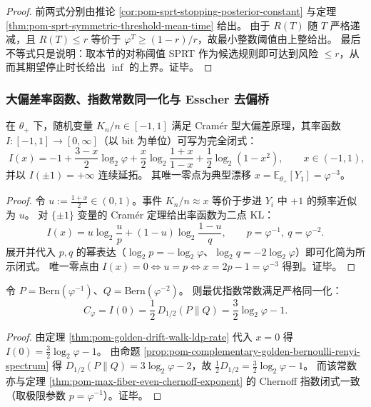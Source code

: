 \begin{proof}
前两式分别由推论 \ref{cor:pom-sprt-stopping-posterior-constant} 与定理 \ref{thm:pom-sprt-symmetric-threshold-mean-time} 给出。
由于 \(R(T)\) 随 \(T\) 严格递减，且 \(R(T)\le r\) 等价于 \(\varphi^T\ge (1-r)/r\)，故最小整数阈值由上整给出。
最后不等式只是说明：取本节的对称阈值 SPRT 作为候选规则即可达到风险 \(\le r\)，从而其期望停止时长给出 \(\inf\) 的上界。证毕。
\end{proof}

\subsubsection{大偏差率函数、指数常数同一化与 Esscher 去偏桥}

\begin{theorem}[黄金漂移随机游走的大偏差率函数闭式]\label{thm:pom-golden-drift-walk-ldp-rate}
在 \(\theta_+\) 下，随机变量 \(K_n/n\in[-1,1]\) 满足 Cram\'er 型大偏差原理，其率函数 \(I:[-1,1]\to[0,\infty]\)（以 bit 为单位）可写为完全闭式：
\[
\boxed{\;
I(x)= -1+\frac{3-x}{2}\log_2\varphi+\frac{x}{2}\log_2\!\frac{1+x}{1-x}+\frac12\log_2(1-x^2),
\qquad x\in(-1,1),\;}
\]
并以 \(I(\pm 1)=+\infty\) 连续延拓。
其唯一零点为典型漂移 \(x=\mathbb{E}_{\theta_+}[Y_1]=\varphi^{-3}\)。
\end{theorem}

\begin{proof}
令 \(u:=\frac{1+x}{2}\in(0,1)\)。事件 \(K_n/n\approx x\) 等价于步进 \(Y_i\) 中 \(+1\) 的频率近似为 \(u\)。
对 \(\{\pm 1\}\) 变量的 Cram\'er 定理给出率函数为二点 KL：
\[
I(x)=u\log_2\frac{u}{p}+(1-u)\log_2\frac{1-u}{q},
\qquad p=\varphi^{-1},\ q=\varphi^{-2}.
\]
展开并代入 \(p,q\) 的幂表达（\(\log_2 p=-\log_2\varphi\)、\(\log_2 q=-2\log_2\varphi\)）即可化简为所示闭式。
唯一零点由 \(I(x)=0\iff u=p\iff x=2p-1=\varphi^{-3}\) 得到。证毕。
\end{proof}

\begin{corollary}[误差指数的三重同一化：Chernoff 常数 = 零漂移大偏差 = 半阶 Rényi 散度的一半]\label{cor:pom-error-exponent-triple-identity}
令 \(P=\mathrm{Bern}(\varphi^{-1})\)、\(Q=\mathrm{Bern}(\varphi^{-2})\)。
则最优指数常数满足严格同一化：
\[
\boxed{\;
C_\varphi
=I(0)
=\frac12\,D_{1/2}(P\|Q)
=\frac32\log_2\varphi-1.\;}
\]
\end{corollary}

\begin{proof}
由定理 \ref{thm:pom-golden-drift-walk-ldp-rate} 代入 \(x=0\) 得 \(I(0)=\frac32\log_2\varphi-1\)。
由命题 \ref{prop:pom-complementary-golden-bernoulli-renyi-spectrum} 得
\(
D_{1/2}(P\|Q)=3\log_2\varphi-2
\)，故 \(\frac12 D_{1/2}=\frac32\log_2\varphi-1\)。
而该常数亦与定理 \ref{thm:pom-max-fiber-even-chernoff-exponent} 的 Chernoff 指数闭式一致（取极限参数 \(p=\varphi^{-1}\)）。证毕。
\end{proof}

